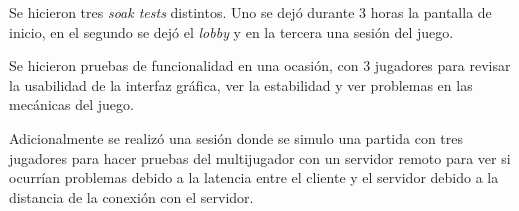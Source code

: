 Se hicieron tres \textit{soak tests} distintos. Uno se dejó durante 3 horas la pantalla de inicio, en el segundo se dejó el \textit{lobby} y en la tercera una sesión del juego.

Se hicieron pruebas de funcionalidad en una ocasión, con 3 jugadores para revisar la usabilidad de la interfaz gráfica, ver la estabilidad y ver problemas en las mecánicas del juego.

Adicionalmente se realizó una sesión donde se simulo una partida con tres jugadores para hacer pruebas del multijugador con un servidor remoto para ver si ocurrían problemas debido a la latencia entre el cliente y el servidor debido a la distancia de la conexión con el servidor.